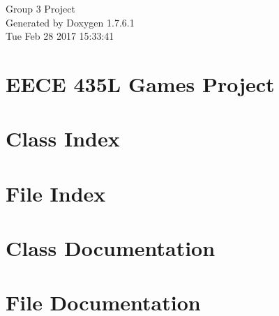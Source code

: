 \documentclass[a4paper]{book}
\begin{document}
\hypersetup{pageanchor=false,citecolor=blue}
\begin{titlepage}
\vspace*{7cm}
\begin{center}
{\Large \-Group 3 \-Project }\\
\vspace*{1cm}
{\large \-Generated by Doxygen 1.7.6.1}\\
\vspace*{0.5cm}
{\small Tue Feb 28 2017 15:33:41}\\
\end{center}
\end{titlepage}
\clearemptydoublepage
{}
\tableofcontents
\clearemptydoublepage
{}
\hypersetup{pageanchor=true,citecolor=blue}
\chapter{\-E\-E\-C\-E 435\-L \-Games \-Project}
\label{index}\hypertarget{index}{}
\chapter{\-Class \-Index}

\chapter{\-File \-Index}

\chapter{\-Class \-Documentation}










\chapter{\-File \-Documentation}




















\printindex
\end{document}
